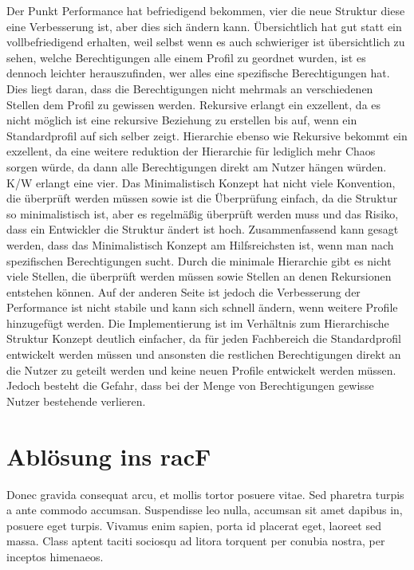 Der Punkt Performance hat befriedigend bekommen, vier die neue Struktur diese eine Verbesserung ist, aber dies sich ändern kann.
Übersichtlich hat gut statt ein vollbefriedigend erhalten, weil selbst wenn es auch schwieriger ist übersichtlich zu sehen, welche Berechtigungen alle einem Profil zu geordnet wurden, ist es dennoch leichter herauszufinden, wer alles eine spezifische Berechtigungen hat.
Dies liegt daran, dass die Berechtigungen nicht mehrmals an verschiedenen Stellen dem Profil zu gewissen werden.
Rekursive erlangt ein exzellent, da es nicht möglich ist eine rekursive Beziehung zu erstellen bis auf, wenn ein Standardprofil auf sich selber zeigt.
Hierarchie ebenso wie Rekursive bekommt ein exzellent, da eine weitere reduktion der Hierarchie für lediglich mehr Chaos sorgen würde, da dann alle Berechtigungen direkt am Nutzer hängen würden.
\ac{K/W} erlangt eine vier. 
Das Minimalistisch Konzept hat nicht viele Konvention, die überprüft werden müssen sowie ist die Überprüfung einfach, da die Struktur so minimalistisch ist, aber es regelmäßig überprüft werden muss und das Risiko, dass ein Entwickler die Struktur ändert ist hoch.
\newline
\newline
Zusammenfassend kann gesagt werden, dass das Minimalistisch Konzept am Hilfsreichsten ist, wenn man nach spezifischen Berechtigungen sucht.
Durch die minimale Hierarchie gibt es nicht viele Stellen, die überprüft werden müssen sowie Stellen an denen Rekursionen entstehen können.
Auf der anderen Seite ist jedoch die Verbesserung der Performance ist nicht stabile und kann sich schnell ändern, wenn weitere Profile hinzugefügt werden.
Die Implementierung ist im Verhältnis zum Hierarchische Struktur Konzept deutlich einfacher, da für jeden Fachbereich die Standardprofil entwickelt werden müssen und ansonsten die restlichen Berechtigungen direkt an die Nutzer zu geteilt werden und keine neuen Profile entwickelt werden müssen.
Jedoch besteht die Gefahr, dass bei der Menge von Berechtigungen gewisse Nutzer bestehende verlieren.

\section{Ablösung ins racF}
\label{sec:chapter05:racF}
Donec gravida consequat arcu, et mollis tortor posuere vitae. Sed pharetra turpis a ante commodo accumsan. Suspendisse leo nulla, accumsan sit amet dapibus in, posuere eget turpis. Vivamus enim sapien, porta id placerat eget, laoreet sed massa. Class aptent taciti sociosqu ad litora torquent per conubia nostra, per inceptos himenaeos.

